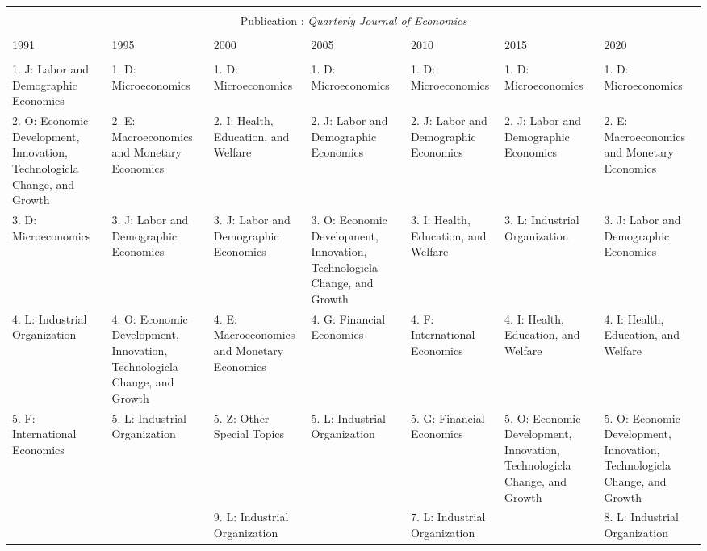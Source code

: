 \begin{table}[h]
\begin{tabular}{@{\extracolsep{5pt}} lllllll}
 
\hline \\[-1.8ex] \multicolumn{7}{c}{Publication : \textit{Quarterly Journal of Economics}} \\
 \cline{1-7} \\
1991 & 1995 & 2000 & 2005 & 2010 & 2015 & 2020 \\ 
\hline \\[-1.8ex] 
1. J: Labor and Demographic Economics & 1. D: Microeconomics & 1. D: Microeconomics & 1. D: Microeconomics & 1. D: Microeconomics & 1. D: Microeconomics & 1. D: Microeconomics \\ 
2. O: Economic Development, Innovation, Technologicla Change, and Growth & 2. E: Macroeconomics and Monetary Economics & 2. I: Health, Education, and Welfare & 2. J: Labor and Demographic Economics & 2. J: Labor and Demographic Economics & 2. J: Labor and Demographic Economics & 2. E: Macroeconomics and Monetary Economics \\ 
3. D: Microeconomics & 3. J: Labor and Demographic Economics & 3. J: Labor and Demographic Economics & 3. O: Economic Development, Innovation, Technologicla Change, and Growth & 3. I: Health, Education, and Welfare & 3. L: Industrial Organization & 3. J: Labor and Demographic Economics \\ 
4. L: Industrial Organization & 4. O: Economic Development, Innovation, Technologicla Change, and Growth & 4. E: Macroeconomics and Monetary Economics & 4. G: Financial Economics & 4. F: International Economics & 4. I: Health, Education, and Welfare & 4. I: Health, Education, and Welfare \\ 
5. F: International Economics & 5. L: Industrial Organization & 5. Z: Other Special Topics & 5. L: Industrial Organization & 5. G: Financial Economics & 5. O: Economic Development, Innovation, Technologicla Change, and Growth & 5. O: Economic Development, Innovation, Technologicla Change, and Growth \\ 
 &  & 9. L: Industrial Organization &  & 7. L: Industrial Organization &  & 8. L: Industrial Organization \\ 


\end{tabular}
\end{table}
